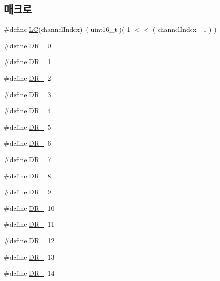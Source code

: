 \subsection*{매크로}
\begin{DoxyCompactItemize}
\item 
\#define \mbox{\hyperlink{group___r_e_g_i_o_n_ga12fa17e5c1016e01a9d82c25027deb1b}{LC}}(channel\+Index)~( uint16\+\_\+t )( 1 $<$$<$ ( channel\+Index -\/ 1 ) )
\item 
\#define \mbox{\hyperlink{group___r_e_g_i_o_n_ga6c4ef966b4f3d5eb7597b087f2b97095}{D\+R\+\_}}~0
\item 
\#define \mbox{\hyperlink{group___r_e_g_i_o_n_ga87e71569dc5f2114e685560de072af26}{D\+R\+\_}}~1
\item 
\#define \mbox{\hyperlink{group___r_e_g_i_o_n_gad402daa928a8b3dea829315fab69de17}{D\+R\+\_}}~2
\item 
\#define \mbox{\hyperlink{group___r_e_g_i_o_n_ga3627849e6360cd275bc74dc519653820}{D\+R\+\_}}~3
\item 
\#define \mbox{\hyperlink{group___r_e_g_i_o_n_ga6ceba6158a7dab238e9d0b846fb47a0c}{D\+R\+\_}}~4
\item 
\#define \mbox{\hyperlink{group___r_e_g_i_o_n_ga872e12c82020c02a7f70a1c6ed1375df}{D\+R\+\_}}~5
\item 
\#define \mbox{\hyperlink{group___r_e_g_i_o_n_ga8e2b4c15b7dbb8bda5ed635ca1d262be}{D\+R\+\_}}~6
\item 
\#define \mbox{\hyperlink{group___r_e_g_i_o_n_ga3a06805baf4f00911a3a5d3dbadebf61}{D\+R\+\_}}~7
\item 
\#define \mbox{\hyperlink{group___r_e_g_i_o_n_ga44cc96ba80ae464cd9330b784d329c16}{D\+R\+\_}}~8
\item 
\#define \mbox{\hyperlink{group___r_e_g_i_o_n_ga67346d631ba28781d6dffb2a7b6fd22f}{D\+R\+\_}}~9
\item 
\#define \mbox{\hyperlink{group___r_e_g_i_o_n_ga8cc471faabc38682537f6a60a30844e4}{D\+R\+\_}}~10
\item 
\#define \mbox{\hyperlink{group___r_e_g_i_o_n_ga77672781eaa7dc6f6892195739a5ef27}{D\+R\+\_}}~11
\item 
\#define \mbox{\hyperlink{group___r_e_g_i_o_n_gafcf0cda11eda5db3d4c4e9a5bd79c0d5}{D\+R\+\_}}~12
\item 
\#define \mbox{\hyperlink{group___r_e_g_i_o_n_ga226f47470cc69a6fe831f7c92709bc1f}{D\+R\+\_}}~13
\item 
\#define \mbox{\hyperlink{group___r_e_g_i_o_n_ga5319f091a90ef4a360cb732be49927c6}{D\+R\+\_}}~14
$$
\end{DoxyCompactItemize}
